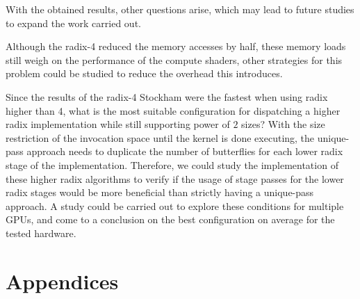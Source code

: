 \documentclass[
  oneside,
  11pt, a4paper,
  footinclude=true,
  headinclude=true,
  cleardoublepage=empty
]{scrbook}
\begin{document}

With the obtained results, other questions arise, which may lead to future studies to expand the work carried out.

Although the radix-4 reduced the memory accesses by half, these memory loads still weigh on the performance of the compute shaders, other strategies for this problem could be studied to reduce the overhead this introduces.

Since the results of the radix-4 Stockham were the fastest when using radix higher than 4, what is the most suitable configuration for dispatching a higher radix implementation while still supporting power of $2$ sizes? With the size restriction of the invocation space until the kernel is done executing, the unique-pass approach needs to duplicate the number of butterflies for each lower radix stage of the implementation. Therefore, we could study the implementation of these higher radix algorithms to verify if the usage of stage passes for the lower radix stages would be more beneficial than strictly having a unique-pass approach. A study could be carried out to explore these conditions for multiple GPUs, and come to a conclusion on the best configuration on average for the tested hardware.



\cleardoublepage



\printindex

    \appendix
    \renewcommand\chaptername{Appendix}



\part{Appendices}
\end{document}

